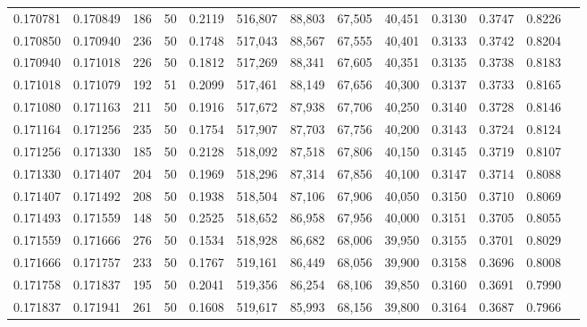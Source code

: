 \begin{tabular}{rrrrrrrrrrrrr}
0.170781 & 0.170849 &   186 &  50 &                                     0.2119 & 516,807 &  88,803 &  67,505 &  40,451 & 0.3130 & 0.3747 & 0.8226 \\
0.170850 & 0.170940 &   236 &  50 &                                     0.1748 & 517,043 &  88,567 &  67,555 &  40,401 & 0.3133 & 0.3742 & 0.8204 \\
0.170940 & 0.171018 &   226 &  50 &                                     0.1812 & 517,269 &  88,341 &  67,605 &  40,351 & 0.3135 & 0.3738 & 0.8183 \\
0.171018 & 0.171079 &   192 &  51 &                                     0.2099 & 517,461 &  88,149 &  67,656 &  40,300 & 0.3137 & 0.3733 & 0.8165 \\
0.171080 & 0.171163 &   211 &  50 &                                     0.1916 & 517,672 &  87,938 &  67,706 &  40,250 & 0.3140 & 0.3728 & 0.8146 \\
0.171164 & 0.171256 &   235 &  50 &                                     0.1754 & 517,907 &  87,703 &  67,756 &  40,200 & 0.3143 & 0.3724 & 0.8124 \\
0.171256 & 0.171330 &   185 &  50 &                                     0.2128 & 518,092 &  87,518 &  67,806 &  40,150 & 0.3145 & 0.3719 & 0.8107 \\
0.171330 & 0.171407 &   204 &  50 &                                     0.1969 & 518,296 &  87,314 &  67,856 &  40,100 & 0.3147 & 0.3714 & 0.8088 \\
0.171407 & 0.171492 &   208 &  50 &                                     0.1938 & 518,504 &  87,106 &  67,906 &  40,050 & 0.3150 & 0.3710 & 0.8069 \\
0.171493 & 0.171559 &   148 &  50 &                                     0.2525 & 518,652 &  86,958 &  67,956 &  40,000 & 0.3151 & 0.3705 & 0.8055 \\
0.171559 & 0.171666 &   276 &  50 &                                     0.1534 & 518,928 &  86,682 &  68,006 &  39,950 & 0.3155 & 0.3701 & 0.8029 \\
0.171666 & 0.171757 &   233 &  50 &                                     0.1767 & 519,161 &  86,449 &  68,056 &  39,900 & 0.3158 & 0.3696 & 0.8008 \\
0.171758 & 0.171837 &   195 &  50 &                                     0.2041 & 519,356 &  86,254 &  68,106 &  39,850 & 0.3160 & 0.3691 & 0.7990 \\
0.171837 & 0.171941 &   261 &  50 &                                     0.1608 & 519,617 &  85,993 &  68,156 &  39,800 & 0.3164 & 0.3687 & 0.7966 \\

\end{tabular}
